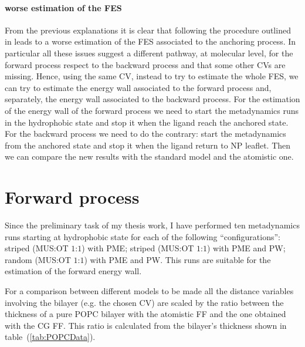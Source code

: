 \paragraph{\textbf{worse estimation of the FES}} From the previous explanations it is clear that following the procedure outlined in \cite{ourPaper} leads to a worse estimation of the \ac{FES} associated to the anchoring process. In particular all these issues suggest a different pathway, at molecular level, for the forward process respect to the backward process and that some other \acp{CV} are missing. Hence, using the same \ac{CV}, instead to try to estimate the whole \ac{FES}, we can try to estimate the energy wall associated to the forward process and, separately, the energy wall associated to the backward process. For the estimation of the energy wall of the forward process we need to start the metadynamics runs in the hydrophobic state and stop it when the ligand reach the anchored state. For the backward process we need to do the contrary: start the metadynamics from the anchored state and stop it when the ligand return to \ac{NP} leaflet. Then we can compare the new results with the standard \martini model and the atomistic one.

\section{Forward process}
Since the preliminary task of my thesis work, I have performed ten metadynamics runs starting at hydrophobic state for each of the following ``configurations'': striped (\ac{MUS}:\ac{OT} $1$:$1$) with \ac{PME}; striped (\ac{MUS}:\ac{OT} $1$:$1$) with \ac{PME} and \ac{PW}; random (\ac{MUS}:\ac{OT} $1$:$1$) with \ac{PME} and \ac{PW}. This runs are suitable for the estimation of the forward energy wall.

For a comparison between different models to be made all the distance variables involving the bilayer (e.g. the chosen \ac{CV}) are scaled by the ratio between the thickness of a pure \ac{POPC} bilayer with the atomistic \ac{FF} and the one obtained with the \ac{CG} \ac{FF}. This ratio is calculated from the bilayer's thickness shown in table~(\ref{tab:POPCData}).
 
